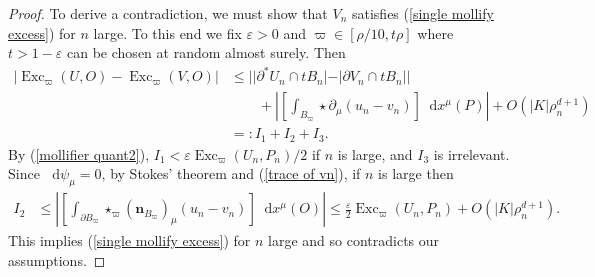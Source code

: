 \documentclass[final,12pt, leqno]{brownthesis}
\DeclareMathOperator{\Exc}{Exc}
\newcommand*\dif{\mathop{}\!\mathrm{d}}
\newcommand{\normal}{\mathbf n}
\theoremstyle{definition}
\numberwithin{equation}{section}
\begin{document}
\begin{proof}
To derive a contradiction, we must show that $V_n$ satisfies (\ref{single mollify excess}) for $n$ large.
To this end we fix $\varepsilon > 0$ and $\varpi \in [\rho/10, t\rho]$ where $t > 1 - \varepsilon$ can be chosen at random almost surely.
Then
\begin{align*}
    |\Exc_\varpi(U, O) - \Exc_\varpi(V, O)|
    &\leq ||\partial^* U_n \cap t B_n| - |\partial V_n \cap t B_n||\\
    &\qquad + \left|\left[\int_{B_\varpi} \star \partial_\mu(u_n - v_n) \right] \dif x^\mu(P)\right| + O(|K| \rho_n^{d + 1}) \\
    &=: I_1 + I_2 + I_3.
\end{align*}
By (\ref{mollifier quant2}), $I_1 < \varepsilon \Exc_\varpi(U_n, P_n)/2$ if $n$ is large, and $I_3$ is irrelevant.
Since $\dif \psi_\mu = 0$, by Stokes' theorem and (\ref{trace of vn}), if $n$ is large then
\begin{align*}
    I_2 &\leq \left|\left[\int_{\partial B_\varpi} \star_\varpi (\normal_{B_\varpi})_\mu (u_n - v_n)\right] \dif x^\mu(O)\right| \leq \frac{\varepsilon}{2} \Exc_\varpi(U_n, P_n) + O(|K| \rho_n^{d + 1}).
\end{align*}
This implies (\ref{single mollify excess}) for $n$ large and so contradicts our assumptions.
\end{proof}
\end{document}
